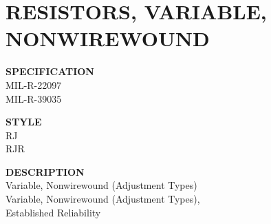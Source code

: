 \section{RESISTORS, VARIABLE, NONWIREWOUND}

\begin{minipage}[t]{0.24\textwidth}
    \textbf{SPECIFICATION}\\
    MIL-R-22097\\MIL-R-39035
\end{minipage}
\hfill
\begin{minipage}[t]{0.12\textwidth}
    \textbf{STYLE}\\
    RJ\\RJR
\end{minipage}
\hfill
\begin{minipage}[t]{0.61\textwidth}
    \textbf{DESCRIPTION}\\
    Variable, Nonwirewound (Adjustment Types)\\Variable, Nonwirewound (Adjustment Types),\\Established Reliability
\end{minipage}

